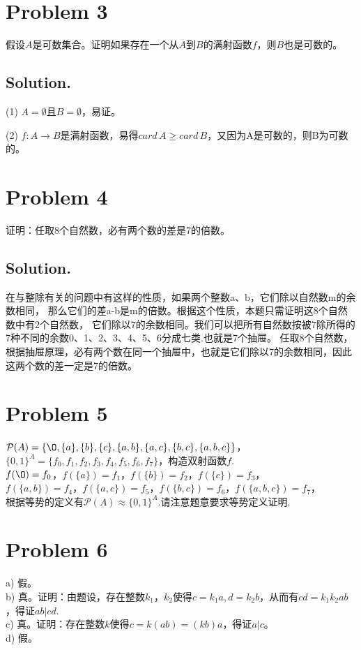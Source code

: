 \documentclass[a4paper]{article}
\begin{document}
\begin{CJK*}{GBK}{song}
\section*{Problem 3}
假设$A$是可数集合。证明如果存在一个从$A$到$B$的满射函数$f$，则$B$也是可数的。
\subsection*{Solution.}
\begin{description}
\item (1) $A=\emptyset$且$B=\emptyset$，易证。
\item (2) $f:A\rightarrow B$是满射函数，易得$card\,A\geq card\,B$，又因为A是可数的，则B为可数的。
\end{description}

\section*{Problem 4}
证明：任取8个自然数，必有两个数的差是7的倍数。
\subsection*{Solution.}
在与整除有关的问题中有这样的性质，如果两个整数a、b，它们除以自然数m的余数相同，
那么它们的差a-b是m的倍数。根据这个性质，本题只需证明这8个自然数中有2个自然数，
它们除以7的余数相同。我们可以把所有自然数按被7除所得的7种不同的余数0、1、2、3、4、5、6分成七类.也就是7个抽屉。
任取8个自然数，
根据抽屉原理，必有两个数在同一个抽屉中，也就是它们除以7的余数相同，因此这两个数的差一定是7的倍数。

\section*{Problem 5}
$\mathcal P (A)=\{\O,\{a\},\{b\},\{c\},\{a,b\},\{a,c\},\{b,c\},\{a,b,c\}\}$，$\{0,1\}^A=\{f_0,f_1,f_2,f_3,f_4,f_5,f_6,f_7 \}$，构造双射函数$f$.\\
$f(\O)=f_0$，$f(\{a\})=f_1$，$f(\{b\})=f_2$，$f(\{c\})=f_3$，\\
$f(\{a,b\})=f_4$，$f(\{a,c\})=f_5$，$f(\{b,c\})=f_6$，$f(\{a,b,c\})=f_7$，\\
根据等势的定义有$\mathcal P(A)\approx \{0,1\}^A$.请注意题意要求等势定义证明.

\section*{Problem 6}
a) 假。\\
b) 真。证明：由题设，存在整数$k_1$，$k_2$使得$c=k_1 a,d=k_2 b$，从而有$cd=k_1 k_2 ab$，得证$ab|cd$.\\
c) 真。证明：存在整数$k$使得$c=k(ab)=(kb)a$，得证$a|c$。\\
d) 假。


\end{CJK*}
\end{document}
